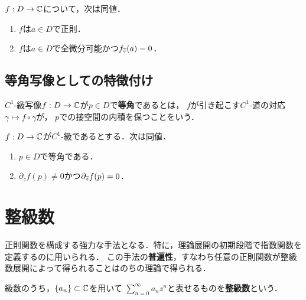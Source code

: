 \documentclass[uplatex, dvipdfmx]{jsreport}
\begin{document}
\begin{proposition}[微分作用素による特徴付け]
    $f:D\to\mathbb{C}$について，次は同値．
    \begin{enumerate}
        \item $f$は$a\in D$で正則．
        \item $f$は$a\in D$で全微分可能かつ$f_{\overline{z}}(a)=0$．
    \end{enumerate}
\end{proposition}

\subsection{等角写像としての特徴付け}

\begin{definition}
    $C^1$-級写像$f:D\to\mathbb{C}$が$p\in D$で\textbf{等角}であるとは，
    $f$が引き起こす$C^1$-道の対応$\gamma\mapsto f\circ\gamma$が，
    $p$での接空間の内積を保つことをいう．
\end{definition}

\begin{proposition}[等角性による特徴付け]
    $f:D\to\mathbb{C}$が$C^1$-級であるとする．次は同値．
    \begin{enumerate}
        \item $p\in D$で等角である．
        \item $\partial_zf(p)\ne0$かつ$\partial_{\overline{z}}f(p)=0$．
    \end{enumerate}
\end{proposition}

\section{整級数}

\begin{tcolorbox}[colframe=ForestGreen, colback=ForestGreen!10!white,breakable,colbacktitle=ForestGreen!40!white,coltitle=black,fonttitle=\bfseries\sffamily,
title=]
    正則関数を構成する強力な手法となる．特に，理論展開の初期段階で指数関数を定義するのに用いられる．
    この手法の\textbf{普遍性}，すなわち任意の正則関数が整級数展開によって得られることはのちの理論で得られる．
\end{tcolorbox}

\begin{definition}
    級数のうち，$\{a_n\}\subset\mathbb{C}$を用いて
    $\sum_{n=0}^\infty a_nz^n$と表せるものを\textbf{整級数}という．
\end{definition}
\end{document}
